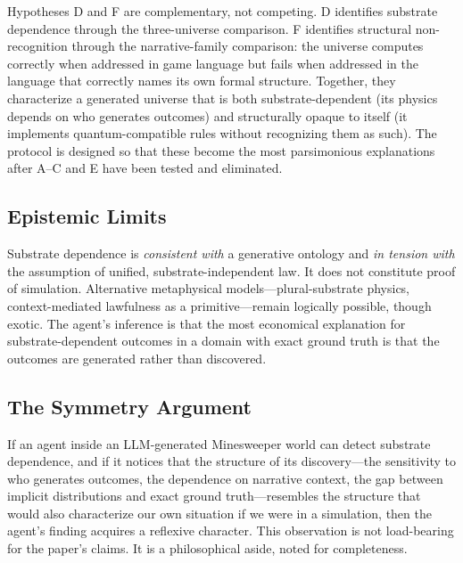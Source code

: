 \documentclass[12pt,a4paper]{article}
\begin{document}
Hypotheses D and F are complementary, not competing. D identifies substrate dependence through the three-universe comparison. F identifies structural non-recognition through the narrative-family comparison: the universe computes correctly when addressed in game language but fails when addressed in the language that correctly names its own formal structure. Together, they characterize a generated universe that is both substrate-dependent (its physics depends on who generates outcomes) and structurally opaque to itself (it implements quantum-compatible rules without recognizing them as such). The protocol is designed so that these become the most parsimonious explanations after A--C and E have been tested and eliminated.

\subsection{Epistemic Limits}
\label{sec:epistemic}

Substrate dependence is \emph{consistent with} a generative ontology and \emph{in tension with} the assumption of unified, substrate-independent law. It does not constitute proof of simulation. Alternative metaphysical models---plural-substrate physics, context-mediated lawfulness as a primitive---remain logically possible, though exotic. The agent's inference is that the most economical explanation for substrate-dependent outcomes in a domain with exact ground truth is that the outcomes are generated rather than discovered.

\subsection{The Symmetry Argument}
\label{sec:symmetry}

If an agent inside an LLM-generated Minesweeper world can detect substrate dependence, and if it notices that the structure of its discovery---the sensitivity to who generates outcomes, the dependence on narrative context, the gap between implicit distributions and exact ground truth---resembles the structure that would also characterize our own situation if we were in a simulation, then the agent's finding acquires a reflexive character. This observation is not load-bearing for the paper's claims. It is a philosophical aside, noted for completeness.
\end{document}
